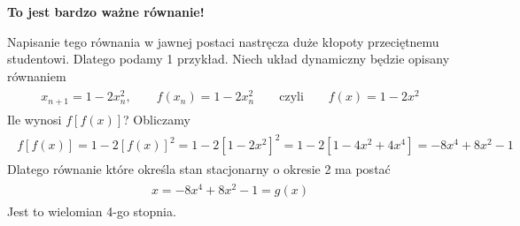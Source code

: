 \documentclass[a4paper,12pt,polish]{sphinxmanual}
\begin{document}
\textbf{To jest bardzo ważne równanie!}

Napisanie tego równania w jawnej postaci nastręcza duże kłopoty przeciętnemu studentowi. Dlatego podamy 1 przykład. Niech układ dynamiczny będzie opisany równaniem
\label{ch1/chI031:equation-eqn30}\begin{gather}
\begin{split}x_{n+1} = 1- 2 x_n^2, \qquad f(x_n) = 1 - 2 x_n^2 \qquad \mbox{czyli} \qquad f(x) = 1 - 2 x^2\end{split}\label{ch1/chI031-eqn30}
\end{gather}
Ile wynosi $f[f(x)]$? Obliczamy
\label{ch1/chI031:equation-eqn31}\begin{gather}
\begin{split}f[f(x)] = 1 - 2 [f(x)]^2  =  1 - 2 [1 - 2 x^2]^2 = 1 - 2[1 - 4 x^2 + 4 x^4] = -8 x^4 + 8 x^2 -1\end{split}\label{ch1/chI031-eqn31}
\end{gather}
Dlatego równanie które określa stan stacjonarny o okresie 2 ma postać
\label{ch1/chI031:equation-eqn32}\begin{gather}
\begin{split}x = -8 x^4 + 8 x^2 -1 = g(x)\end{split}\label{ch1/chI031-eqn32}
\end{gather}
Jest to wielomian 4-go stopnia.
\end{document}
